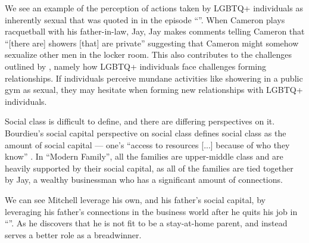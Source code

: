 \documentclass[12pt, letterpaper]{article}
\begin{document}
We see an example of the perception of actions taken by LGBTQ+ individuals as inherently sexual that was quoted in \autocite{sexuality_lecture} in the episode ``''. When Cameron plays racquetball with his father-in-law, Jay, Jay makes comments telling Cameron that ``[there are] showers [that] are private'' suggesting that Cameron might somehow sexualize other men in the locker room. This also contributes to the challenges outlined by \autocite{sexuality_lecture}, namely how LGBTQ+ individuals face challenges forming relationships. If individuals perceive mundane activities like showering in a public gym as sexual, they may hesitate when forming new relationships with LGBTQ+ individuals.

Social class is difficult to define, and there are differing perspectives on it. Bourdieu's social capital perspective on social class defines social class as the amount of social capital --- one's ``access to resources [...] because of who they know'' \autocite{social_class_lecture}. In ``Modern Family'', all the families are upper-middle class and are heavily supported by their social capital, as all of the families are tied together by Jay, a wealthy businessman who has a significant amount of connections.

We can see Mitchell leverage his own, and his father's social capital, by leveraging his father's connections in the business world after he quits his job in ``''. As he discovers that he is not fit to be a stay-at-home parent, and instead serves a better role as a breadwinner.




\clearpage

\printbibliography
\end{document}
